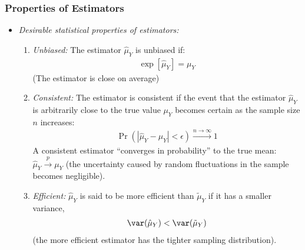 \begin{frame}
\frametitle{Properties of Estimators}
\begin{itemize}
\item \emph{Desirable statistical properties of estimators:}
\begin{enumerate}
\item \emph{Unbiased:} The estimator $\hat{\mu}_{Y}$ is unbiased if:
\begin{align*}
\exp[\hat{\mu}_{Y}] = \mu_{Y}
\end{align*}
(The estimator is close on average)
\item \emph{Consistent:} The estimator is consistent if the event that the estimator $\hat{\mu}_{Y}$ is arbitrarily close to the true value $\mu_{Y}$ becomes certain as the sample size $n$ increases:
\begin{align*}
\Pr(|\hat{\mu}_{Y}-\mu_{Y}|<\epsilon) \xrightarrow{n\to\infty}  1
\end{align*}
A consistent estimator ``converges in probability'' to the true mean:  $\hat{\mu}_{Y}\xrightarrow{p}\mu_{Y}$ (the uncertainty caused by random fluctuations in the sample becomes negligible).
\item \emph{Efficient:} 
$\hat{\mu}_{Y}$ is said to be more efficient than $\tilde{\mu}_{Y}$ if
it has a smaller variance,
\begin{align*}
\var(\hat{\mu}_{Y}) < \var(\tilde{\mu}_{Y}) 
\end{align*}
(the more efficient estimator has the tighter sampling distribution).
\end{enumerate}
\end{itemize}
\end{frame}


